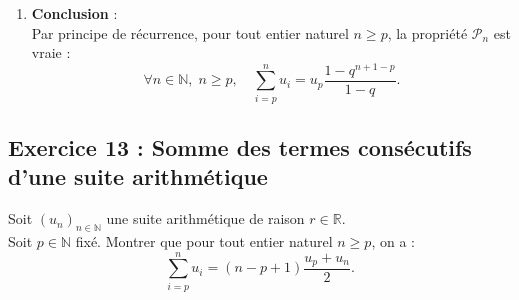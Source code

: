 \documentclass[11pt,a4paper]{article}
\newcommand{\N}{\mathbb{N}}
\newcommand{\R}{\mathbb{R}}
\begin{document}
\begin{correctionbox}
\begin{enumerate}[label=\textbf{\arabic*.}]
    \item \textbf{Conclusion} :\\
    Par principe de récurrence, pour tout entier naturel $n \ge p$, la propriété $\mathcal{P}_n$ est vraie :
    \[
    \forall n \in \N, \; n \ge p, \quad \sum_{i=p}^n u_i = u_p \frac{1 - q^{n+1-p}}{1 - q}.
    \]
\end{enumerate}
\end{correctionbox}

\subsection*{Exercice 13 : Somme des termes consécutifs d'une suite arithmétique}

Soit $(u_n)_{n \in \N}$ une suite arithmétique de raison $r \in \R$.\\
Soit $p \in \N$ fixé. Montrer que pour tout entier naturel $n \ge p$, on a :
\[
\sum_{i=p}^n u_i = (n - p + 1) \frac{u_p + u_n}{2}.
\]
\end{document}
